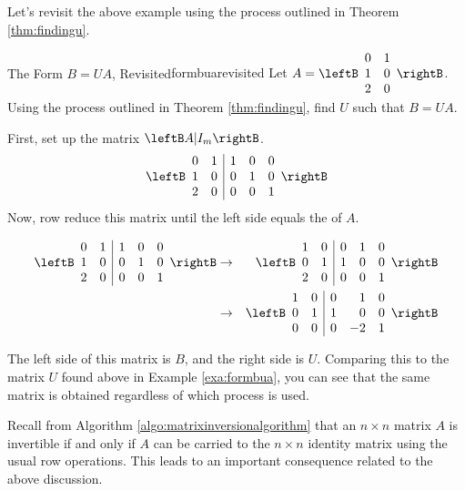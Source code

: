 Let's revisit the above example using the process outlined in Theorem \ref{thm:findingu}.

\begin{example}{The Form $B=UA$, Revisited}{formbuarevisited}
Let $A = \leftB 
\begin{array}{rr} 
0 & 1 \\
1 & 0 \\
2 & 0 
\end{array}\rightB$. Using the process outlined in Theorem \ref{thm:findingu}, find $U$ such that $B=UA$. 
\end{example}

\begin{solution}
First, set up the matrix $\leftB A | I_m \rightB$. 
\[
\leftB \begin{array}{rr|rrr}
0 & 1 & 1 & 0 & 0 \\
1 & 0 & 0 & 1 & 0 \\
2 & 0 & 0 & 0 & 1 
\end{array}\rightB
\]
Now, row reduce this matrix until the left side equals the \rref\; of $A$. 

\begin{eqnarray*}
\leftB \begin{array}{rr|rrr}
0 & 1 & 1 & 0 & 0 \\
1 & 0 & 0 & 1 & 0 \\
2 & 0 & 0 & 0 & 1 
\end{array}\rightB 
&\rightarrow& 
\leftB \begin{array}{rr|rrr}
1 & 0 & 0 & 1 & 0 \\
0 & 1 & 1 & 0 & 0 \\
2 & 0 & 0 & 0 & 1 
\end{array}\rightB \\
&\rightarrow&
\leftB \begin{array}{rr|rrr}
1 & 0 & 0 & 1 & 0 \\
0 & 1 & 1 & 0 & 0 \\
0 & 0 & 0 & -2 & 1 
\end{array}\rightB
\end{eqnarray*}

The left side of this matrix is $B$, and the right side is $U$. Comparing this to the matrix $U$ found above in Example \ref{exa:formbua}, you can see that the same matrix is obtained regardless of which process is used. 
\end{solution}

Recall from Algorithm \ref{algo:matrixinversionalgorithm} that an $n \times n$  matrix $A$ is invertible if and only if $A$ can be carried to the $n \times n$ identity matrix using the usual row operations. This leads to an important consequence related to the above discussion. 

